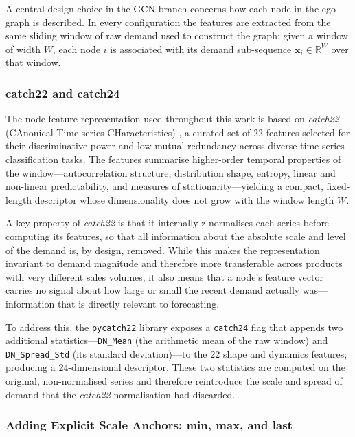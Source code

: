 A central design choice in the GCN branch concerns how each node in the
ego-graph is described. In every configuration the features are extracted from
the same sliding window of raw demand used to construct the graph: given a
window of width $W$, each node $i$ is associated with its demand
sub-sequence $\mathbf{x}_i \in \mathbb{R}^{W}$ over that window.

\subsubsection{catch22 and catch24}

The node-feature representation used throughout this work is based on
\textit{catch22} (CAnonical Time-series CHaracteristics)
\cite{Lubba2019}, a curated set of 22
features selected for their discriminative power and low mutual redundancy
across diverse time-series classification tasks.  The features summarise
higher-order temporal properties of the window---autocorrelation structure,
distribution shape, entropy, linear and non-linear predictability, and
measures of stationarity---yielding a compact, fixed-length descriptor whose
dimensionality does not grow with the window length $W$.

A key property of \textit{catch22} is that it internally z-normalises each
series before computing its features, so that all information about the
absolute scale and level of the demand is, by design, removed.  While this
makes the representation invariant to demand magnitude and therefore more
transferable across products with very different sales volumes, it also means
that a node's feature vector carries no signal about how large or small the
recent demand actually was---information that is directly relevant to
forecasting.

To address this, the \texttt{pycatch22} library exposes a \texttt{catch24}
flag that appends two additional statistics---\texttt{DN\_Mean} (the arithmetic
mean of the raw window) and \texttt{DN\_Spread\_Std} (its standard
deviation)---to the 22 shape and dynamics features, producing a 24-dimensional
descriptor.  These two statistics are computed on the original, non-normalised
series and therefore reintroduce the scale and spread of demand that the
\textit{catch22} normalisation had discarded.

\subsubsection{Adding Explicit Scale Anchors: min, max, and last}


